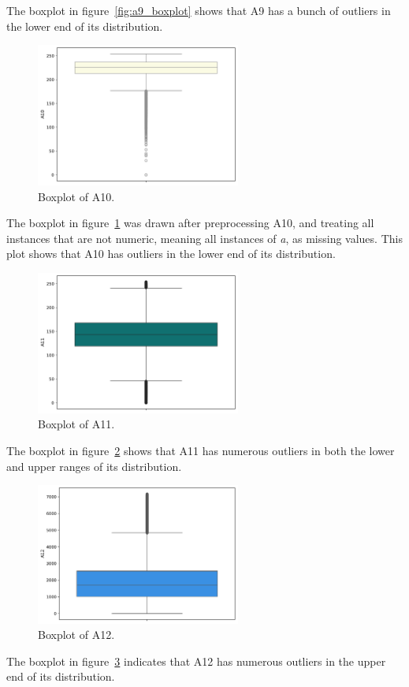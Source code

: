\documentclass[11pt]{report}
\begin{document}
The boxplot in figure~\ref{fig:a9_boxplot} shows that A9 has a bunch of outliers in the lower end of its distribution.

\begin{figure}[H]
    \centering
    \includegraphics[width=0.6\textwidth]{images/A10_boxplot.pdf}
    \caption{Boxplot of A10.}
    \label{fig:a10_boxplot}
\end{figure}

The boxplot in figure~\ref{fig:a10_boxplot} was drawn after preprocessing A10, and treating all instances that are not numeric, meaning all instances of \textit{a}, as missing values. This plot shows that A10 has outliers in the lower end of its distribution.

\begin{figure}[H]
    \centering
    \includegraphics[width=0.6\textwidth]{images/A11_boxplot.pdf}
    \caption{Boxplot of A11.}
    \label{fig:a11_boxplot}
\end{figure}

The boxplot in figure~\ref{fig:a11_boxplot} shows that A11 has numerous outliers in both the lower and upper ranges of its distribution.

\begin{figure}[H]
    \centering
    \includegraphics[width=0.6\textwidth]{images/A12_boxplot.pdf}
    \caption{Boxplot of A12.}
    \label{fig:a12_boxplot}
\end{figure}

The boxplot in figure~\ref{fig:a12_boxplot} indicates that A12 has numerous outliers in the upper end of its distribution.
\end{document}
